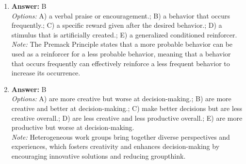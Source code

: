 \documentclass[12pt]{article}
\begin{document}
\begin{enumerate}[label=\arabic*.]
\item \textbf{Answer:} B
\\ \textit{Options:} A) a verbal praise or encouragement.; B) a behavior that occurs frequently.; C) a specific reward given after the desired behavior.; D) a stimulus that is artificially created.; E) a generalized conditioned reinforcer.
\\ \textit{Note:} The Premack Principle states that a more probable behavior can be used as a reinforcer for a less probable behavior, meaning that a behavior that occurs frequently can effectively reinforce a less frequent behavior to increase its occurrence.
\item \textbf{Answer:} B
\\ \textit{Options:} A) are more creative but worse at decision-making.; B) are more creative and better at decision-making.; C) make better decisions but are less creative overall.; D) are less creative and less productive overall.; E) are more productive but worse at decision-making.
\\ \textit{Note:} Heterogeneous work groups bring together diverse perspectives and experiences, which fosters creativity and enhances decision-making by encouraging innovative solutions and reducing groupthink.
\end{enumerate}
\end{document}
